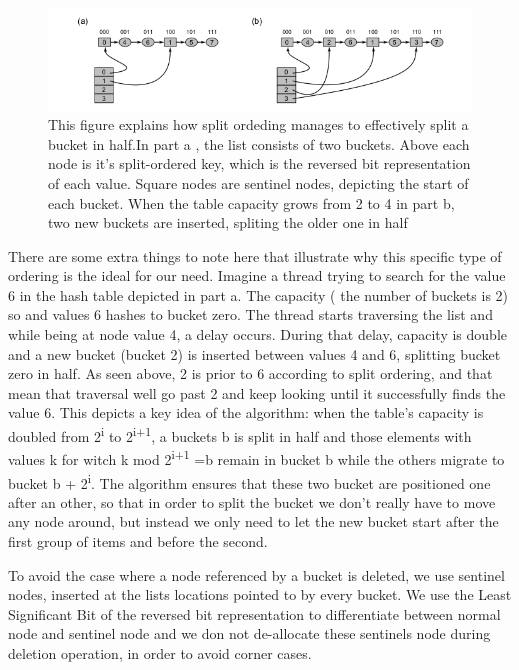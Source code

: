 \begin{figure}
 \centering
  \includegraphics[scale=0.5]{split_ordered_1.png}
\caption{This figure explains how split ordeding manages to effectively split a bucket in half.In part a , the list consists of two buckets. Above each node is it's split-ordered key, which is the reversed bit representation of each value. Square nodes are sentinel nodes, depicting the start of each bucket. When the table capacity grows from 2 to 4 in  part b, two new buckets are inserted, spliting the older one in half}
\label{split_ordered_1}
\end{figure}

There are some extra things to note here that illustrate why this specific type of ordering is the ideal for our need. Imagine a thread trying to search for the value 6 in the hash table depicted in part a. The capacity ( the number of buckets is 2) so and values 6 hashes to bucket zero. The thread starts traversing the list and while being at node value 4, a delay occurs. During that delay, capacity is double and a new bucket (bucket 2) is inserted between values 4 and 6, splitting bucket zero in half. As seen above, 2 is prior to 6 according to split ordering, and that mean that traversal well go past 2 and keep looking until it successfully finds the value 6. This depicts a key idea of the algorithm: when the table's capacity is doubled from 2\textsuperscript{i} to 2\textsuperscript{i+1}, a buckets b is split in half and those elements with values k for witch k mod 2\textsuperscript{i+1} =b  remain in bucket b while the others migrate to bucket b + 2\textsuperscript{i}. The algorithm ensures that these two bucket are positioned one after an other, so that in order to split the bucket we don’t really have to move any node around, but instead we only need to let the new bucket start after the first group of items and before the second.

To avoid the case where a node referenced by a bucket is deleted, we use sentinel nodes, inserted at the lists locations pointed to by every bucket. We use the Least Significant Bit of the reversed bit representation to differentiate between normal node and sentinel node and we don not de-allocate these sentinels node during deletion operation, in order to avoid corner cases.

